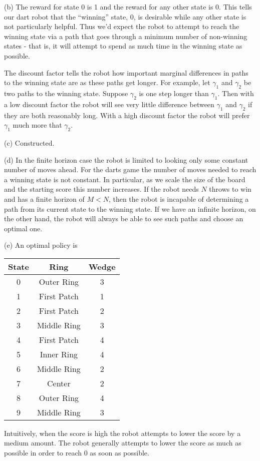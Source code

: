 \documentclass[12pt]{article}
\theoremstyle{remark}
\begin{document}
(b) The reward for state 0 is 1 and the reward for any other state is $0$. This tells our dart robot that the ``winning'' state, 0, is desirable while any other state is not particularly helpful. Thus we'd expect the robot to attempt to reach the winning state via a path that goes through a minimum number of non-winning states - that is, it will attempt to spend as much time in the winning state as possible.

The discount factor tells the robot how important marginal differences in paths to the winning state are as these paths get longer. For example, let $\gamma_1$ and $\gamma_2$ be two paths to the winning state. Suppose $\gamma_2$ is one step longer than $\gamma_1$. Then with a low discount factor the robot will see very little difference between $\gamma_1$ and $\gamma_2$ if they are both reasonably long. With a high discount factor the robot will prefer $\gamma_1$ much more that $\gamma_2$.

(c) Constructed.

(d) In the finite horizon case the robot is limited to looking only some constant number of moves ahead. For the darts game the number of moves needed to reach a winning state is not constant. In particular, as we scale the size of the board and the starting score this number increases. If the robot needs $N$ throws to win and has a finite horizon of $M<N$, then the robot is incapable of determining a path from its current state to the winning state. If we have an infinite horizon, on the other hand, the robot will always be able to see such paths and choose an optimal one.

(e) An optimal policy is

\begin{tabular}{c|cc}
State&Ring&Wedge\\
\hline
0&Outer Ring&3\\
1&First Patch&1\\
2&First Patch&2\\
3&Middle Ring&3\\
4&First Patch&4\\
5&Inner Ring&4\\
6&Middle Ring&2\\
7&Center&2\\
8&Outer Ring&4\\
9&Middle Ring&3
\end{tabular}

Intuitively, when the score is high the robot attempts to lower the score by a medium amount. The robot generally attempts to lower the score as much as possible in order to reach 0 as soon as possible.
\end{document}
